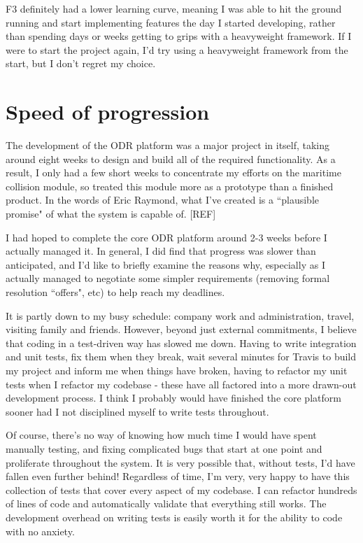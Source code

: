 F3 definitely had a lower learning curve, meaning I was able to hit the ground running and start implementing features the day I started developing, rather than spending days or weeks getting to grips with a heavyweight framework. If I were to start the project again, I'd try using a heavyweight framework from the start, but I don't regret my choice.

\section{Speed of progression}

The development of the ODR platform was a major project in itself, taking around eight weeks to design and build all of the required functionality. As a result, I only had a few short weeks to concentrate my efforts on the maritime collision module, so treated this module more as a prototype than a finished product. In the words of Eric Raymond, what I've created is a ``plausible promise" of what the system is capable of. [REF]

I had hoped to complete the core ODR platform around 2-3 weeks before I actually managed it. In general, I did find that progress was slower than anticipated, and I'd like to briefly examine the reasons why, especially as I actually managed to negotiate some simpler requirements (removing formal resolution ``offers", etc) to help reach my deadlines.

It is partly down to my busy schedule: company work and administration, travel, visiting family and friends. However, beyond just external commitments, I believe that coding in a test-driven way has slowed me down. Having to write integration and unit tests, fix them when they break, wait several minutes for Travis to build my project and inform me when things have broken, having to refactor my unit tests when I refactor my codebase - these have all factored into a more drawn-out development process. I think I probably would have finished the core platform sooner had I not disciplined myself to write tests throughout.

Of course, there's no way of knowing how much time I would have spent manually testing, and fixing complicated bugs that start at one point and proliferate throughout the system. It is very possible that, without tests, I'd have fallen even further behind! Regardless of time, I'm very, very happy to have this collection of tests that cover every aspect of my codebase. I can refactor hundreds of lines of code and automatically validate that everything still works. The development overhead on writing tests is easily worth it for the ability to code with no anxiety.

